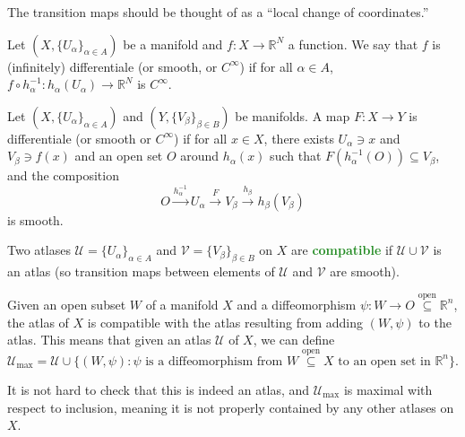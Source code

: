 \documentclass[11pt]{scrartcl}
\providecommand{\RR}{\mathbb R}
\providecommand{\inv}{^{-1}}
\providecommand{\vocab}[1]{{\textbf{\textcolor{ForestGreen}{#1}}}}
\begin{document}
The transition maps should be thought of as a ``local change of coordinates.''

\begin{definition}[Smooth map to $\RR^N$]
    \label{def:smooth-map-RN}
    Let $(X,\{U_\alpha\}_{\alpha\in A})$ be a manifold
    and $f\colon X\to\RR^N$ a function.
    We say that $f$ is (infinitely) differentiale (or smooth, or $C^\infty$) if
    for all $\alpha\in A$, $f\circ h_\alpha\inv : h_\alpha(U_\alpha)\to\RR^N$
    is $C^\infty$.
\end{definition}

\begin{definition}
    \label{def:smooth-map-man}
    Let $(X,\{U_\alpha\}_{\alpha\in A})$ and
    $(Y,\{V_\beta\}_{\beta\in B})$ be manifolds.
    A map $F\colon X\to Y$ is differentiale (or smooth or $C^\infty$) if
    for all $x\in X$, there exists $U_\alpha\ni x$ and
    $V_\beta\ni f(x)$ and an open set $O$ around
    $h_\alpha(x)$ such that $F(h\inv_\alpha(O))\subseteq V_\beta$,
    and the composition
    \begin{equation*}
	O\stackrel{h\inv_\alpha}{\longrightarrow} U_\alpha
	\stackrel{F}{\longrightarrow} V_\beta
	\stackrel{h_\beta}{\longrightarrow} h_\beta(V_\beta)
    \end{equation*}
    is smooth.
\end{definition}

\begin{definition}
    \label{def:atlas-compatibility}
    Two atlases $\mathcal U = \{U_\alpha\}_{\alpha\in A}$ and
    $\mathcal V = \{V_\beta\}_{\beta\in B}$ on $X$
    are \vocab{compatible} if $\mathcal U\cup\mathcal V$ is an atlas
    (so transition maps between elements of $\mathcal U$ and $\mathcal V$
    are smooth).
\end{definition}

Given an open subset $W$ of a manifold $X$ and a diffeomorphism
$\psi\colon W\to O\stackrel{\text{open}}\subseteq \RR^n$,
the atlas of $X$ is compatible with the atlas resulting from
adding $(W,\psi)$ to the atlas. This means that given an atlas
$\mathcal U$ of $X$, we can define
\begin{equation*}
    \mathcal U_{\text{max}} = \mathcal U \cup
    \{ (W,\psi) : \psi\text{ is a diffeomorphism from
	    $W\stackrel{\text{open}}\subseteq X$ to
    an open set in $\RR^n$} \}.
\end{equation*}

It is not hard to check that this is indeed an atlas,
and $\mathcal U_{\text{max}}$ is maximal with respect to inclusion,
meaning it is not properly contained by any other atlases on $X$.
\end{document}
